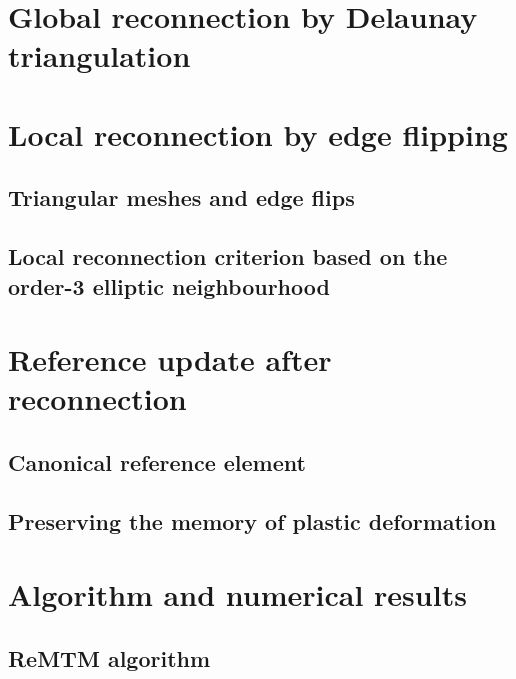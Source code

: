   \section{Global reconnection by Delaunay triangulation}
  \label{sec:DelaunayGlobalRules}

\section{Local reconnection by edge flipping}
\label{sec:LocalReconnectionEdgeFlipping}

  \subsection{Triangular meshes and edge flips}
  \label{sec:TriangularMeshesEdgeFlips}

  \subsection{Local reconnection criterion based on the order-3 elliptic neighbourhood}
  \label{sec:OrderThreeEllipticNeighbourhood}

\section{Reference update after reconnection}
\label{sec:ReferenceUpdateReconnection}

  \subsection{Canonical reference element}
  \label{sec:CanonicalReferenceElement}

  \subsection{Preserving the memory of plastic deformation}
  \label{sec:PlasticMemory}

\section{Algorithm and numerical results}
\label{sec:ReMTMAlgorithmResults}

  \subsection{ReMTM algorithm}
  \label{sec:ReMTMAlgorithm}

